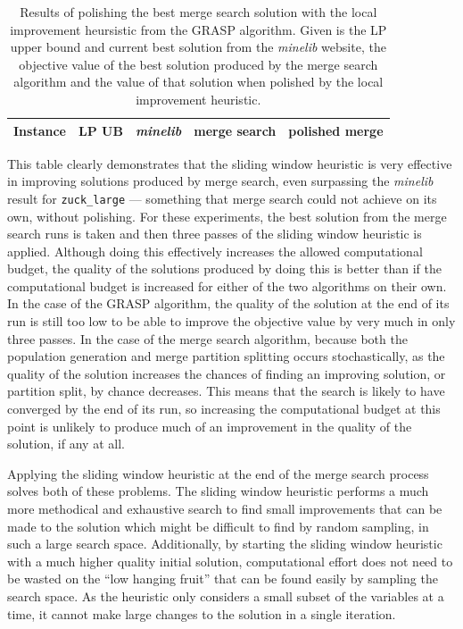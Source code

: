 \documentclass[authoryear,11pt,square,number,times,super,comma]{elsarticle}
\newcommand{\zucklarge}{\texttt{zuck\_large}}
\begin{document}
\begin{table}[h!]
\centering
\caption[Results of polishing the best merge search solution]{Results of polishing the best merge search solution with the local improvement heursistic from the GRASP algorithm. Given is the LP upper bound and current best solution from the \emph{minelib} website, the objective value of the best solution produced by the merge search algorithm and the value of that solution when polished by the local improvement heuristic.}\label{tab:mine:polish}
\begin{adjustbox}{width=0.6\textwidth}
\begin{tabular}{lrrrr} \toprule
Instance & \multicolumn{1}{c}{LP UB} & \multicolumn{1}{c}{\emph{minelib}} & \multicolumn{1}{c}{merge search} & polished merge\\ 
\midrule
%

%
\bottomrule
\end{tabular}
\end{adjustbox}
\end{table}

This table clearly demonstrates that the sliding window heuristic is very effective in improving solutions produced by merge search, even surpassing the \emph{minelib} result for \zucklarge{} --- something that merge search could not achieve on its own, without polishing. For these experiments, the best solution from the merge search runs is taken and then three passes of the sliding window heuristic is applied. Although doing this effectively increases the allowed computational budget, the quality of the solutions produced by doing this is better than if the computational budget is increased for either of the two algorithms on their own. In the case of the GRASP algorithm, the quality of the solution at the end of its run is still too low to be able to improve the objective value by very much in only three passes. In the case of the merge search algorithm, because both the population generation and merge partition splitting occurs stochastically, as the quality of the solution increases the chances of finding an improving solution, or partition split, by chance decreases. This means that the search is likely to have converged by the end of its run, so increasing the computational budget at this point is unlikely to produce much of an improvement in the quality of the solution, if any at all.

Applying the sliding window heuristic at the end of the merge search process solves both of these problems. The sliding window heuristic performs a much more methodical and exhaustive search to find small improvements that can be made to the solution which might be difficult to find by random sampling, in such a large search space. Additionally, by starting the sliding window heuristic with a much higher quality initial solution, computational effort does not need to be wasted on the ``low hanging fruit'' that can be found easily by sampling the search space. As the heuristic only considers a small subset of the variables at a time, it cannot make large changes to the solution in a single iteration. 
\end{document}
